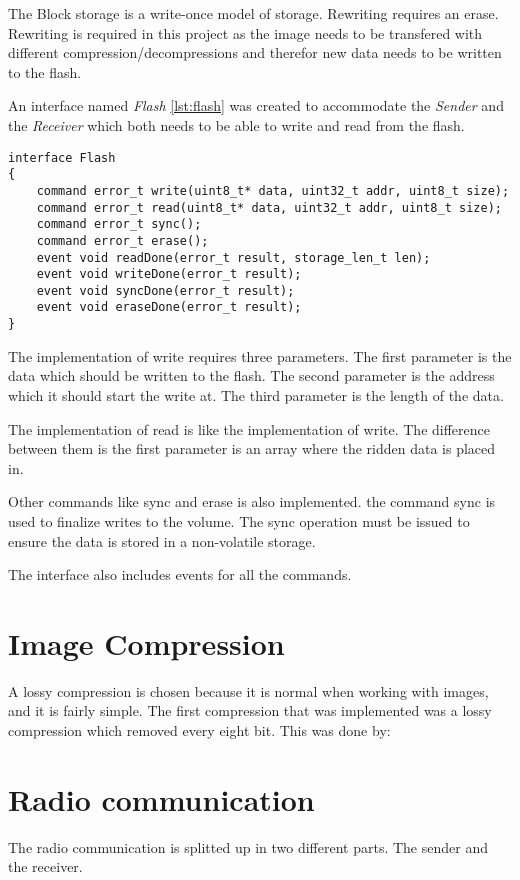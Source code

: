 The Block storage is a write-once model of storage. Rewriting requires an erase. Rewriting is required in this project as the image needs to be transfered with different compression/decompressions and therefor new data needs to be written to the flash.

An interface named \emph{Flash} \ref{lst:flash} was created to accommodate the \emph{Sender} and the \emph{Receiver} which both needs to be able to write and read from the flash. 

\begin{lstlisting}[caption={The interface flash}, label=lst:flash]
interface Flash
{
	command error_t write(uint8_t* data, uint32_t addr, uint8_t size);
	command error_t read(uint8_t* data, uint32_t addr, uint8_t size);
	command error_t sync();
	command error_t erase();
	event void readDone(error_t result, storage_len_t len);
	event void writeDone(error_t result);
	event void syncDone(error_t result);
	event void eraseDone(error_t result);	
}
\end{lstlisting}

The implementation of write requires three parameters. The first parameter is the data which should be written to the flash. The second parameter is the address which it should start the write at. The third parameter is the length of the data. 

The implementation of read is like the implementation of write. The difference between them is the first parameter is an array where the ridden data is placed in. 

Other commands like sync and erase is also implemented. the command sync is used to finalize writes to the volume. The sync operation must be issued to ensure the data is stored in a non-volatile storage. 

The interface also includes events for all the commands. 

\section{Image Compression}
A lossy compression is chosen because it is normal when working with images, and it is fairly simple. The first compression that was implemented was a lossy compression which removed every eight bit. This was done by:

\section{Radio communication}
The radio communication is splitted up in two different parts. The sender and the receiver.

